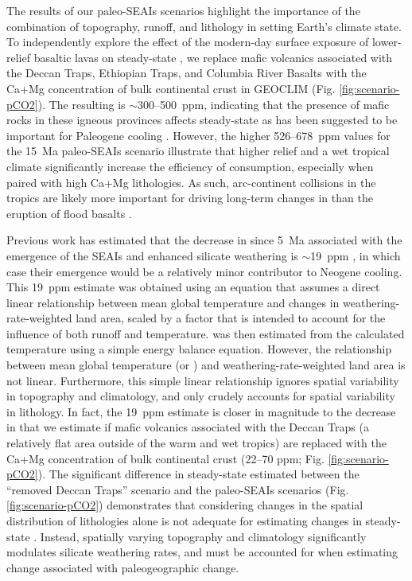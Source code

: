 The results of our paleo-SEAIs scenarios highlight the importance of the combination of topography, runoff, and lithology in setting Earth's climate state. To independently explore the effect of the modern-day surface exposure of lower-relief basaltic lavas on steady-state \pCOtwo \citep{Kent2013a}, we replace mafic volcanics associated with the Deccan Traps, Ethiopian Traps, and Columbia River Basalts with the Ca+Mg concentration of bulk continental crust in GEOCLIM (Fig. \ref{fig:scenario-pCO2}). The resulting \pCOtwo is $\sim$300--500~ppm, indicating that the presence of mafic rocks in these igneous provinces affects steady-state \pCOtwo as has been suggested to be important for Paleogene cooling \citep{Kent2013a}. However, the higher 526--678~ppm values for the 15~Ma paleo-SEAIs scenario illustrate that higher relief and a wet tropical climate significantly increase the efficiency of \COtwo consumption, especially when paired with high Ca+Mg lithologies. As such, arc-continent collisions in the tropics are likely more important for driving long-term changes in \pCOtwo than the eruption of flood basalts \citep{Macdonald2019a, Park2019a}.

Previous work has estimated that the decrease in \pCOtwo since 5~Ma associated with the emergence of the SEAIs and enhanced silicate weathering is $\sim$19~ppm \citep{Molnar2015a}, in which case their emergence would be a relatively minor contributor to Neogene cooling. This 19~ppm estimate was obtained using an equation that assumes a direct linear relationship between mean global temperature and changes in weathering-rate-weighted land area, scaled by a factor that is intended to account for the influence of both runoff and temperature. \pCOtwo was then estimated from the calculated temperature using a simple energy balance equation. However, the relationship between mean global temperature (or \pCOtwo) and weathering-rate-weighted land area is not linear. Furthermore, this simple linear relationship ignores spatial variability in topography and climatology, and only crudely accounts for spatial variability in lithology. In fact, the 19~ppm estimate is closer in magnitude to the decrease in \pCOtwo that we estimate if mafic volcanics associated with the Deccan Traps (a relatively flat area outside of the warm and wet tropics) are replaced with the Ca+Mg concentration of bulk continental crust (22--70 ppm; Fig. \ref{fig:scenario-pCO2}). The significant difference in steady-state \pCOtwo estimated between the ``removed Deccan Traps'' scenario and the paleo-SEAIs scenarios (Fig. \ref{fig:scenario-pCO2}) demonstrates that considering changes in the spatial distribution of lithologies alone is not adequate for estimating changes in steady-state \pCOtwo. Instead, spatially varying topography and climatology significantly modulates silicate weathering rates, and must be accounted for when estimating \pCOtwo change associated with paleogeographic change.

